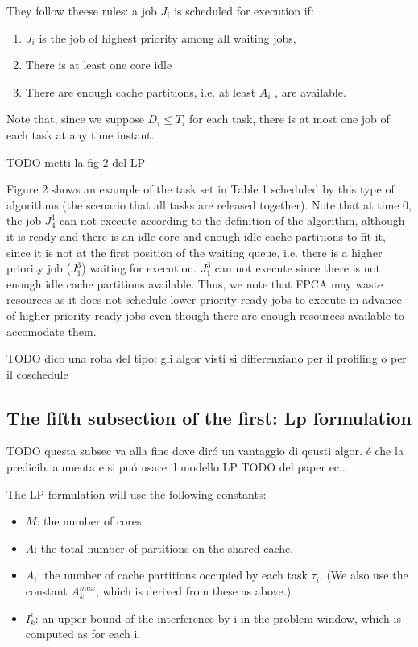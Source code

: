 \documentclass[a4paper,10pt]{article}
\begin{document}
\begin{multicols}{2}
They follow theese rules: a job $J_i$ is scheduled for execution if:

\begin{enumerate}
	\item $J_i$ is the job of highest priority among all waiting jobs,
	\item There is at least one core idle
	\item There are enough cache partitions, i.e. at least $A_i$ , are available.
\end{enumerate}
  
Note that, since we suppose $D_i \le T_i$ for each task, there is at most one job of each task at any time instant.

TODO metti la fig 2 del LP

Figure 2 shows an example of the task set in Table 1 scheduled by this type of algorithms (the scenario that all tasks are released
together). Note that at time 0, the job $J_{4}^1$ can not execute according to the definition of the algorithm, although it is ready and
there is an idle core and enough idle cache partitions to fit it, since it is not at the first position of the waiting queue,
i.e. there is a higher priority job ($J_{1}^3$) waiting for execution. $J_{1}^3$ can not execute since there is not enough idle cache
partitions available. Thus, we note that FPCA may waste resources as it does not schedule lower priority ready jobs to execute in advance of 
higher priority ready jobs even though there are enough resources available to accomodate them.


TODO dico una roba del tipo: gli algor visti si differenziano per il profiling o per il coschedule




\subsection{The fifth subsection of the first: Lp formulation}

TODO questa subsec va alla fine dove dir\'o un vantaggio di qeusti algor. \'e che la predicib. aumenta e si pu\'o usare il modello LP 
TODO del paper ec..

The LP formulation will use the following constants:
\begin{itemize}
	\item $M$: the number of cores.
	\item $A$: the total number of partitions on the shared cache.
	\item $A_{i}$: the number of cache partitions occupied by each task $\tau_{i}$. (We also use the constant $A_{k}^{max}$, which is 
		     derived from these as above.)
	\item $I_{k}^i$: an upper bound of the interference by i in the problem window, which is computed as for each i.
\end{itemize}


\end{multicols}
\end{document}
